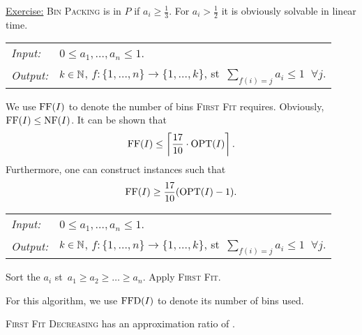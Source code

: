 \documentclass[../skript.tex]{subfiles}
\begin{document}
\underline{Exercise:} \textsc{Bin Packing} is in $P$ if $a_i \geq \frac{1}{3}$. For $a_i > \frac{1}{2}$ it is obviously solvable in linear time.
\begin{samepage}
\begin{algorithmbox}
\begin{tabular}{@{}ll}
\textit{Input:} & $0 \leq a_1, \ldots, a_n \leq 1$. \\
\textit{Output:} & $k \in \mathbb{N}$, $f : \{ 1, \ldots, n\} \to \{ 1, \ldots, k\}$, \ac{st}\ $\sum_{f(i) = j} a_i \leq 1 \;\; \forall j$.
\end{tabular}
\end{algorithmbox}
\vspace{-7pt}
\begin{algorithm}[H]
\end{algorithm}
\vspace{-7pt}
\EndAlgorithmLine
\end{samepage}
We use $\operatorname{FF}(I)$ to denote the number of bins \textsc{First Fit} requires. Obviously, $\operatorname{FF}(I) \leq \operatorname{NF}(I)$.
It can be shown that
\[
	\operatorname{FF}(I) \leq \left\lceil \frac{17}{10} \cdot \operatorname{OPT}(I) \right\rceil.
\]
Furthermore, one can construct instances such that
\[
	\operatorname{FF}(I) \geq \frac{17}{10} (\operatorname{OPT}(I) - 1).
\]
\begin{samepage}
\begin{algorithmbox}
\begin{tabular}{@{}ll}
\textit{Input:} & $0 \leq a_1, \ldots, a_n \leq 1$. \\
\textit{Output:} & $k \in \mathbb{N}$, $f : \{ 1, \ldots, n\} \to \{ 1, \ldots, k\}$, \ac{st}\ $\sum_{f(i) = j} a_i \leq 1 \;\; \forall j$.
\end{tabular}
\end{algorithmbox}
\vspace{-7pt}
\begin{algorithm}[H]
Sort the $a_i$ \ac{st}\ $a_1 \geq a_2 \geq \ldots \geq a_n$.\;
Apply \textsc{First Fit}.
\end{algorithm}
\vspace{-7pt}
\EndAlgorithmLine
\end{samepage}
For this algorithm, we use $\operatorname{FFD}(I)$ to denote its number of bins used.
\begin{theorem} %
\label{thm:54}
\textsc{First Fit Decreasing} has an approximation ratio of .
\end{theorem}
\end{document}

